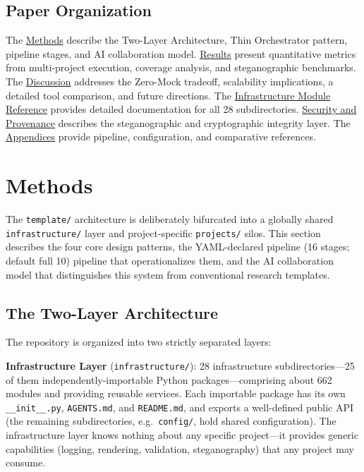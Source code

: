 \documentclass[
  english,
]{article}
\begin{document}
\subsection{Paper Organization}\label{paper-organization}

The \href{03a_architecture.md\#methods}{Methods} describe the Two-Layer
Architecture, Thin Orchestrator pattern, pipeline stages, and AI
collaboration model. \href{04_results.md\#results}{Results} present
quantitative metrics from multi-project execution, coverage analysis,
and steganographic benchmarks. The
\href{05a_zeromock_tradeoff.md\#the-zero-mock-tradeoff}{Discussion}
addresses the Zero-Mock tradeoff, scalability implications, a detailed
tool comparison, and future directions. The
\href{06_infrastructure_modules.md\#infrastructure-module-reference}{Infrastructure
Module Reference} provides detailed documentation for all 28
subdirectories.
\href{07_security_provenance.md\#security-and-provenance}{Security and
Provenance} describes the steganographic and cryptographic integrity
layer. The
\href{08a_appendix_pipeline.md\#appendix-pipeline}{Appendices} provide
pipeline, configuration, and comparative references.

\newpage

\section{Methods}\label{methods}

The \texttt{template/} architecture is deliberately bifurcated into a
globally shared \texttt{infrastructure/} layer and project-specific
\texttt{projects/} silos. This section describes the four core design
patterns, the YAML-declared pipeline (16 stages; default full 10)
pipeline that operationalizes them, and the AI collaboration model that
distinguishes this system from conventional research templates.

\subsection{The Two-Layer
Architecture}\label{the-two-layer-architecture}

The repository is organized into two strictly separated layers:

\textbf{Infrastructure Layer} (\texttt{infrastructure/}): 28
infrastructure subdirectories---25 of them independently-importable
Python packages---comprising about 662 modules and providing
reusable services. Each importable package has its own
\texttt{\_\_init\_\_.py}, \texttt{AGENTS.md}, and \texttt{README.md},
and exports a well-defined public API (the remaining subdirectories,
e.g.~\texttt{config/}, hold shared configuration). The infrastructure
layer knows nothing about any specific project---it provides generic
capabilities (logging, rendering, validation, steganography) that any
project may consume.
\end{document}
